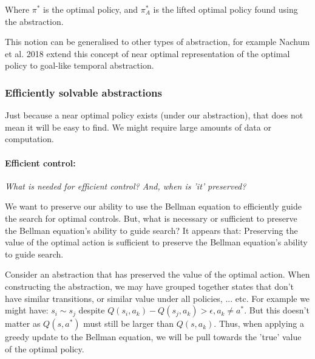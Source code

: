 Where $\pi^{* }$ is the optimal policy, and $\pi_{A}^{* }$ is the lifted optimal
policy found using the abstraction.

This notion can be generalised to other types of abstraction, for example
Nachum et al. 2018 \cite{Nachum2018} extend this concept of near optimal
representation of the optimal policy to goal-like temporal abstraction. \footnotemark[13]


\newpage
\subsubsection{Efficiently solvable abstractions}

Just because a near optimal policy exists (under our abstraction), that does not mean it will be easy to find.
We might require large amounts of data or computation.

\paragraph{Efficient control:} \label{efficient-control} \textsl{What is needed for efficient control? And, when is 'it' preserved?}

We want to preserve our ability to use the Bellman equation to efficiently guide the search for optimal controls.
But, what is necessary or sufficient to preserve the Bellman equation's ability to guide search?
It appears that: Preserving the value of the optimal action is sufficient to preserve the Bellman equation's ability to guide search. \cite{Jong2005,Littman2006,Abel2017}

Consider an abstraction that has preserved the value of the optimal action.
When constructing the abstraction, we may have grouped together states that don't have similar transitions, or similar value under all policies, ... etc.
For example we might have: $s_i \sim s_j$ despite $Q(s_i, a_k) - Q(s_j, a_k) > \epsilon, a_k \neq a^{* }$.
But this doesn't matter as $Q(s, a^{* })$ must still be larger than $Q(s, a_k)$.
Thus, when applying a greedy update to the Bellman equation, we will be pull towards the 'true' value of the optimal policy\footnotemark[26].


